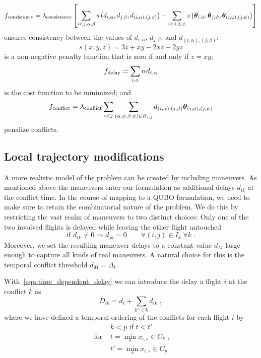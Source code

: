 \begin{equation}
f_{\mathrm{consistency}}
=
\lambda_{\mathrm{consistency}}
\left[
\sum_{i < j,\alpha, \beta} 
s\left(d_{i,\alpha}, d_{j, \beta}, d_{(i, \alpha), (j, \beta)}\right)
+
\sum_{i < j,\phi, \psi} 
s\left(\boldsymbol \theta_{i,\phi}, \boldsymbol \theta_{j, \psi}, \boldsymbol \theta_{(i, \phi), (j, \psi)}\right)
\right]
\end{equation}
ensures consistency between the values of $d_{i,\alpha}$, $d_{j, \beta}$, and $d_{(i, \alpha), (j, \beta)}$;
\begin{equation}
s(x, y, z) = 3z + xy - 2xz - 2 yz
\end{equation}
is a non-negative penalty function that is zero if and only if $z = xy$;
\begin{equation}
f_{\mathrm{delay}}
= \sum_{i, \alpha} \alpha d_{i, \alpha}
\end{equation}
is the cost function to be minimized; and
\begin{equation}
  f_{\mathrm{conflict}}
=
\lambda_{\mathrm{conflict}}
\sum_{i < j} 
\sum_{(\alpha, \phi, \beta, \psi) \in B_{i, j}} 
d_{(i, \alpha), (j, \beta)} \boldsymbol \theta_{(i, \phi), (j, \psi)}
\end{equation}
penalize conflicts.

\subsection{Local trajectory modifications}

A more realistic model of the problem can be created by including maneuvers.
As mentioned above the maneuvers enter our formulation as additional delays $d_{ik}$ at the conflict time.
In the course of mapping to a QUBO formulation, we need to make sure to retain the combinatorial nature of the problem.
We do this by restricting the vast realm of maneuvers to two distinct choices:
Only one of the two involved flights is delayed while leaving the other flight untouched
\begin{equation} \label{eqn:maneuver_model_maneuver_decision}
    \text{if } d_{ik} \neq 0 \Rightarrow d_{jk} = 0  \qquad \forall (i, j) \in I_k \; \forall k \; .
\end{equation}
Moreover, we set the resulting maneuver delays to a constant value $d_M$ large enough to capture all kinds of real maneuvers.
A natural choice for this is the temporal conflict threshold $d_M = \Delta_t$.

With~\eqref{eqn:time_dependent_delay} we can introduce the delay a flight $i$ at the conflict $k$ as
\begin{equation} \label{eqn:maneuver_model_delay_at_conflict}
    D_{ik} = d_i + \sum_{k'<k} d_{ik} \; ,
\end{equation}
where we have defined a temporal ordering of the conflicts for each flight $i$ by
\begin{align*}
                 &k < p \text{ if } t < t' \\
    \text{ for } &t = \min_s x_{i, s} \in C_k \; , \\
                 &t' = \min_s x_{i, s} \in C_p
\end{align*}

